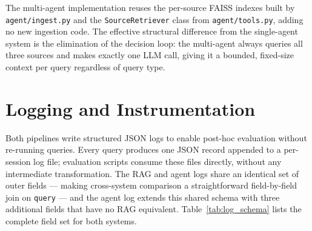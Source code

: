 The multi-agent implementation reuses the per-source FAISS indexes built by \texttt{agent/ingest.py} and the \texttt{SourceRetriever} class from \texttt{agent/tools.py}, adding no new ingestion code. The effective structural difference from the single-agent system is the elimination of the decision loop: the multi-agent always queries all three sources and makes exactly one LLM call, giving it a bounded, fixed-size context per query regardless of query type.

\section{Logging and Instrumentation}
\label{sec:logging}

Both pipelines write structured JSON logs to enable post-hoc evaluation without re-running queries. Every query produces one JSON record appended to a per-session log file; evaluation scripts consume these files directly, without any intermediate transformation. The RAG and agent logs share an identical set of outer fields — making cross-system comparison a straightforward field-by-field join on \texttt{query} — and the agent log extends this shared schema with three additional fields that have no RAG equivalent. Table~\ref{tab:log_schema} lists the complete field set for both systems.

